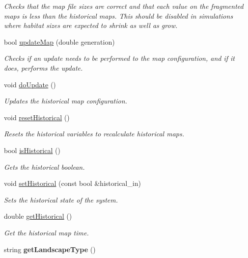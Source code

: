 \begin{DoxyCompactItemize}
\begin{DoxyCompactList}\small\item\em Checks that the map file sizes are correct and that each value on the fragmented maps is less than the historical maps. This should be disabled in simulations where habitat sizes are expected to shrink as well as grow. \end{DoxyCompactList}\item 
bool \hyperlink{class_landscape_a568d5338ce85c35a66461033ced3cb05}{update\+Map} (double generation)
\begin{DoxyCompactList}\small\item\em Checks if an update needs to be performed to the map configuration, and if it does, performs the update. \end{DoxyCompactList}\item 
void \hyperlink{class_landscape_a1669ae6563ef5ed11ce1da30fb28214b}{do\+Update} ()\hypertarget{class_landscape_a1669ae6563ef5ed11ce1da30fb28214b}{}\label{class_landscape_a1669ae6563ef5ed11ce1da30fb28214b}

\begin{DoxyCompactList}\small\item\em Updates the historical map configuration. \end{DoxyCompactList}\item 
void \hyperlink{class_landscape_a03e35a3a42e40a683be01e75413d30d2}{reset\+Historical} ()
\begin{DoxyCompactList}\small\item\em Resets the historical variables to recalculate historical maps. \end{DoxyCompactList}\item 
bool \hyperlink{class_landscape_ab302f8a4ae779d20df94cb2525187cac}{is\+Historical} ()
\begin{DoxyCompactList}\small\item\em Gets the historical boolean. \end{DoxyCompactList}\item 
void \hyperlink{class_landscape_a7b1c5459e1ecf8d11c1dd12299a53c61}{set\+Historical} (const bool \&historical\+\_\+in)
\begin{DoxyCompactList}\small\item\em Sets the historical state of the system. \end{DoxyCompactList}\item 
double \hyperlink{class_landscape_a6b15e6748d7d776deaa489e618750983}{get\+Historical} ()
\begin{DoxyCompactList}\small\item\em Get the historical map time. \end{DoxyCompactList}\item 
string {\bfseries get\+Landscape\+Type} ()\hypertarget{class_landscape_a5dec397270e8278478f807660e43d565}{}\label{class_landscape_a5dec397270e8278478f807660e43d565}


\end{DoxyCompactItemize}
